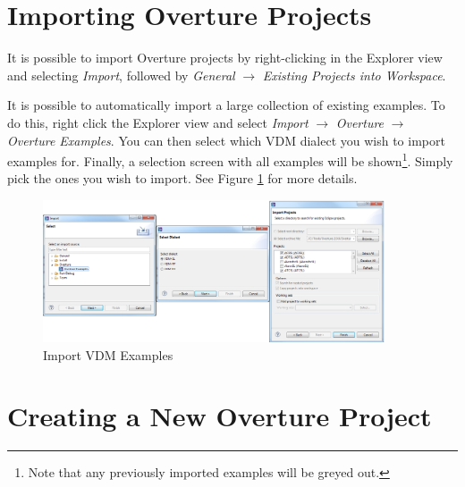 \documentclass{overturerepchap}
\begin{document}
\section{Importing Overture Projects}\label{subsec:importproj}

It is possible to import Overture projects by
right-clicking in the Explorer view and selecting \emph{Import}, followed
by \emph{General} $\rightarrow$ \emph{Existing Projects into
  Workspace}.  


It is possible to automatically import a large collection of existing examples. 
To do this, right click the Explorer view and select
\emph{Import} $\rightarrow$ \emph{Overture} $\rightarrow$ \emph{Overture
Examples}.  You can then select which VDM dialect you wish to import examples
for. Finally, a selection screen with all examples will be shown\footnote{Note
that any previously imported examples will be greyed out.}. Simply pick the ones
you wish to import. See Figure \ref{fig:example_import} for more
details.


\begin{figure}[!htb]
	\begin{center}
	  \includegraphics[width=0.9\textwidth]{figures/ImportExamples}
	  \caption[Import existing VDM Examples]{Import VDM Examples}
	  \label{fig:example_import}
	\end{center}
\end{figure}


\section{Creating a New Overture Project}
\end{document}
